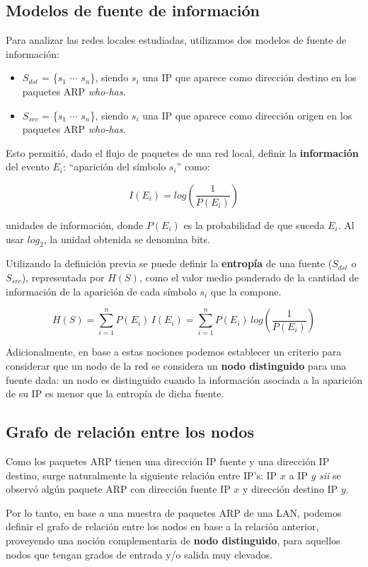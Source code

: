 \subsection{Modelos de fuente de información}

Para analizar las redes locales estudiadas, utilizamos dos modelos de fuente de información:
\vspace*{-2mm}

\begin{itemize}
  \item $S_{dst}$ = \{$s_1$ $\cdots$ $s_n$\}, siendo $s_i$ una IP que aparece como dirección destino en los paquetes ARP \emph{who-has}.
  \item $S_{src}$ = \{$s_1$ $\cdots$ $s_n$\}, siendo $s_i$ una IP que aparece como dirección origen en los paquetes ARP \emph{who-has}.
\end{itemize}

Esto permitió, dado el flujo de paquetes de una red local, definir la \textbf{información} del evento $E_i$: ``aparición del símbolo $s_i$'' como:

$$I (E_i) = log\left(\frac{1}{P(E_i)}\right)$$

unidades de información, donde $P(E_i)$ es la probabilidad de que suceda $E_i$. Al usar $log_2$, la unidad obtenida se denomina bits.

Utilizando la definición previa se puede definir la \textbf{entropía} de una fuente ($S_{dst}$ o $S_{src}$), representada por $H(S)$, como el valor medio ponderado de la cantidad de información de la aparición de cada símbolo $s_i$ que la compone.

$$H(S) = \sum_{i=1}^{n} P(E_i)\,I(E_i) = \sum_{i=1}^{n} P(E_i)\,log\left(\frac{1}{P(E_i)}\right)$$

Adicionalmente, en base a estas nociones podemos establecer un criterio para considerar que un nodo de la red se considera un \textbf{nodo distinguido} para una fuente dada: un nodo es distinguido cuando la información asociada a la aparición de su IP es menor que la entropía de dicha fuente.

\subsection{Grafo de relación entre los nodos}
\label{subsec:grafo-relacion-nodos}

Como los paquetes ARP tienen una dirección IP fuente y una dirección IP destino, surge naturalmente la siguiente relación entre IP's: IP $x$ a IP $y$ \emph{sii} se observó algún paquete ARP con dirección fuente IP $x$ y dirección destino IP $y$.

Por lo tanto, en base a una muestra de paquetes ARP de una LAN, podemos definir el grafo de relación entre los nodos en base a la relación anterior, proveyendo una noción complementaria de \textbf{nodo distinguido}, para aquellos nodos que tengan grados de entrada y/o salida muy elevados.